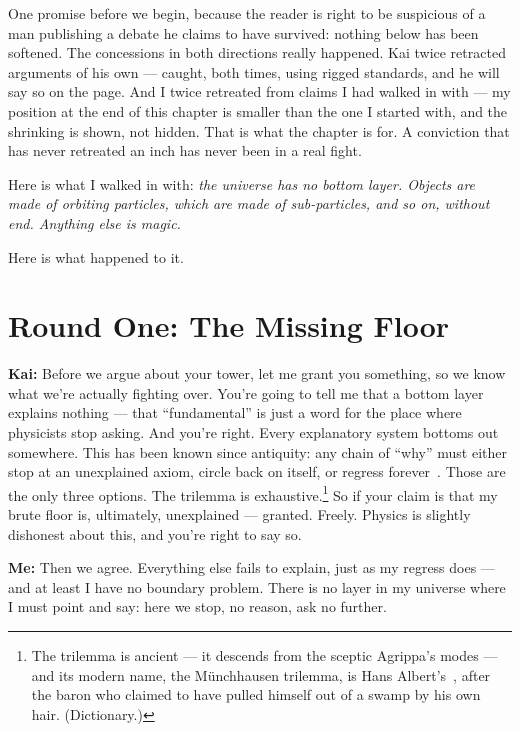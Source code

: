 \documentclass[fontsize=11pt,paper=a4,pagesize=auto,parskip=half-]{scrbook}
\newcommand\En{\centerline{\textemdash \qquad \ding{166} \qquad \textemdash}}
\newcommand{\speaker}[1]{\par\noindent\textbf{#1:}\hspace{0.6em}}
\begin{document}
One promise before we begin, because the reader is right to be suspicious of a man publishing a debate he claims to have survived: nothing below has been softened. The concessions in both directions really happened. Kai twice retracted arguments of his own --- caught, both times, using rigged standards, and he will say so on the page. And I twice retreated from claims I had walked in with --- my position at the end of this chapter is smaller than the one I started with, and the shrinking is shown, not hidden. That is what the chapter is for. A conviction that has never retreated an inch has never been in a real fight.

Here is what I walked in with: \emph{the universe has no bottom layer. Objects are made of orbiting particles, which are made of sub-particles, and so on, without end. Anything else is magic.}

Here is what happened to it.

\En

\section{Round One: The Missing Floor}

\speaker{Kai} Before we argue about your tower, let me grant you something, so we know what we're actually fighting over. You're going to tell me that a bottom layer explains nothing --- that ``fundamental'' is just a word for the place where physicists stop asking. And you're right. Every explanatory system bottoms out somewhere. This has been known since antiquity: any chain of ``why'' must either stop at an unexplained axiom, circle back on itself, or regress forever~\cite{sextus}. Those are the only three options. The trilemma is exhaustive.\footnote{The trilemma is ancient --- it descends from the sceptic Agrippa's modes --- and its modern name, the M\"unchhausen trilemma, is Hans Albert's~\cite{albert1985}, after the baron who claimed to have pulled himself out of a swamp by his own hair. (Dictionary.)} So if your claim is that my brute floor is, ultimately, unexplained --- granted. Freely. Physics is slightly dishonest about this, and you're right to say so.

\speaker{Me} Then we agree. Everything else fails to explain, just as my regress does --- and at least I have no boundary problem. There is no layer in my universe where I must point and say: here we stop, no reason, ask no further.
\end{document}
